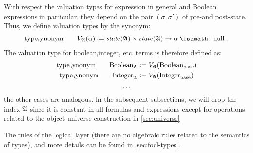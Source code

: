 With respect the valuation types for \OCL expression in general and Boolean expressions in
particular, they depend on the pair $(\sigma, \sigma')$ of pre-and post-state.  
Thus, we define valuation types by the synonym:
\begin{equation}
\typesynonym \qquad  \V{\isaAA}{\alpha} \defeq \state{\isaAA} \times \state{\isaAA} \to \alpha \ofType \TCnull \mi{.}
\end{equation}
The valuation type for boolean,integer, etc. \OCL terms is therefore defined as:
\begin{gather*}
\mathrm{type_synonym} \qquad \text{Boolean}_{\mathfrak{A}} \mathrel{\mathop:}=  V_{\mathfrak{A}}({\text{Boolean}_{\text{base}}}) \\
\mathrm{type_synonym} \qquad \text{Integer}_{\mathfrak{A}} \mathrel{\mathop:}=  V_{\mathfrak{A}}({\text{Integer}_{\text{base}}}) \\
\ldots 
\end{gather*}
the other cases are analogous. In the subsequent subsections, we will drop the index $\mathfrak{A}$ since
it is constant in all formulas and expressions except for operations related to the object universe
construction in \autoref{sec:universe}

The rules of the logical layer (there are no algebraic rules related to the semantics of types),
and more details can be found in  \autoref{sec:focl-types}.

